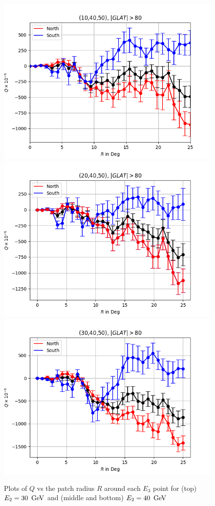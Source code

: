 \documentclass[english]{article}
\newcommand{\GeV}{\,{\rm GeV}}
\begin{document}
\begin{figure}
	\includegraphics[scale=0.5]{10_40_50_full.png}
	\includegraphics[scale=0.5]{20_40_50_full.png}\includegraphics[scale=0.5]{30_40_50_full.png}

	\caption{Plots of $Q$ vs the patch radius $R$ around each $E_3$
	point for (top) $E_2 = 30\ \GeV$ and (middle and bottom) 
	$E_2=40\ \GeV$}
	\label{fig:hemisphere_lg80}
\end{figure}
\end{document}
